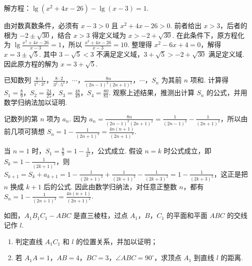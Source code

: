 \documentclass[UTF8,a4paper,oneside,11pt]{ctexbook}
\begin{document}
\begin{problem}
解方程：\(\lg (x^2 + 4x - 26) - \lg (x - 3) = 1\).
\end{problem}

\begin{solution}
由对数真数条件，必须有 \(x-3>0\) 且 \(x^2+4x-26>0\). 前者给出 \(x>3\)，后者的根为 \(-2\pm\sqrt{30}\)，结合 \(x>3\) 得定义域为 \(x>-2+\sqrt{30}\). 在此条件下，原方程化为
\(\displaystyle\lg\frac{x^2+4x-26}{x-3}=1\)，所以 \(\frac{x^2+4x-26}{x-3}=10\). 整理得 \(x^2-6x+4=0\)，解得 \(x=3\pm\sqrt{5}\). 其中 \(3-\sqrt{5}<3\) 不满足定义域，\(3+\sqrt{5}>-2+\sqrt{30}\) 满足定义域. 因此原方程的解为 \(x=3+\sqrt{5}\).
\end{solution}

\begin{problem}
已知数列 \(\frac{8 \cdot 1}{1^2 \cdot 3^2}\)，\(\frac{8 \cdot 2}{3^2 \cdot 5^2}\)，\(\cdots\)，\(\frac{8n}{(2n-1)^2 (2n+1)^2}\)，\(\cdots\)，\(S_n\) 为其前 \(n\) 项和. 计算得 \(S_1 = \frac{8}{9}\)，\(S_2 = \frac{24}{25}\)，\(S_3 = \frac{48}{49}\)，\(S_4 = \frac{80}{81}\). 观察上述结果，推测出计算 \(S_n\) 的公式，并用数学归纳法加以证明.
\end{problem}

\begin{solution}
记数列的第 \(n\) 项为 \(a_n\). 因为
\(\displaystyle a_n=\frac{8n}{(2n-1)^2(2n+1)^2}=\frac{1}{(2n-1)^2}-\frac{1}{(2n+1)^2}\)，所以由前几项可猜想
\(\displaystyle S_n=1-\frac{1}{(2n+1)^2}=\frac{4n(n+1)}{(2n+1)^2}\).

当 \(n=1\) 时，\(\displaystyle S_1=\frac{8}{9}=1-\frac{1}{3^2}\)，公式成立. 假设 \(n=k\) 时公式成立，即 \(\displaystyle S_k=1-\frac{1}{(2k+1)^2}\)，则
\(\displaystyle S_{k+1}=S_k+a_{k+1}=1-\frac{1}{(2k+1)^2}+\frac{1}{(2k+1)^2}-\frac{1}{(2k+3)^2}=1-\frac{1}{(2k+3)^2}\)，这正是把 \(n\) 换成 \(k+1\) 后的公式. 因此由数学归纳法，对任意正整数 \(n\)，都有 \(\displaystyle S_n=1-\frac{1}{(2n+1)^2}=\frac{4n(n+1)}{(2n+1)^2}\).
\end{solution}

\begin{problem}
如图，\(A_{1}B_{1}C_{1}-ABC\) 是直三棱柱，过点 \(A_{1}\)，\(B\)，\(C_{1}\) 的平面和平面 \(ABC\) 的交线记作 \(l\).

\begin{enumerate}
\item 判定直线 \(A_{1}C_{1}\) 和 \(l\) 的位置关系，并加以证明；
\item 若 \(A_{1}A = 1\)，\(AB = 4\)，\(BC = 3\)，\(\angle ABC = 90^{\circ}\)，求顶点 \(A_{1}\) 到直线 \(l\) 的距离.
\end{enumerate}

\end{problem}
\end{document}
